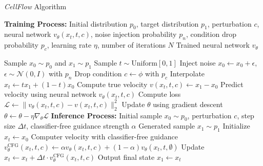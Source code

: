 \begin{algorithm}[htbp]
\caption{\emph{CellFlow} Algorithm}
\label{alg:flow_matching}

\begin{minipage}{\linewidth}
\begin{algorithmic}
\STATE \hspace{-1em}\textbf{Training Process:}
\INPUT Initial distribution $p_0$, target distribution $p_1$, perturbation $c$, 
neural network $v_\theta(x_t, t, c)$, noise injection probability $p_n$, condition drop probability $p_c$, learning rate $\eta$, number of iterations $N$
\OUTPUT Trained neural network $v_\theta$

    \STATE Sample $x_0 \sim p_0$ and $x_1 \sim p_1$
    \STATE Sample $t \sim \text{Uniform}[0, 1]$
    \STATE Inject noise $x_0 \gets x_0 + \epsilon$, $\epsilon \sim \mathcal{N}(0,I)$ with $p_n$
    \STATE Drop condition $c \gets \phi$ with $p_c$
    \STATE Interpolate $x_t \gets t x_1 + (1-t)x_0$
    \STATE Compute true velocity $v(x_t, t, c) \gets x_1 - x_0$
    \STATE Predict velocity using neural network $v_\theta(x_t, t, c)$
    \STATE Compute loss $\mathcal{L} \gets \| v_\theta(x_t, t, c) - v(x_t, t, c) \|_2^2$
    \STATE Update $\theta$ using gradient descent $\theta \gets \theta - \eta \nabla_\theta \mathcal{L}$
\ENDFOR
\vspace{1em}
\STATE \hspace{-1em}\textbf{Inference Process:}
\INPUT Initial sample $x_0 \sim p_0$, perturbation $c$, step size $\Delta t$, classifier-free guidance strength $\alpha$
\OUTPUT Generated sample $x_1 \sim p_1$
\STATE Initialize $x_t \gets x_0$
    \STATE Computer velocity with classifier-free guidance $v_\theta^\text{CFG}(x_t, t, c) \gets \alpha v_\theta(x_t, t, c) + (1-\alpha) v_\theta(x_t, t, \emptyset)$
    \STATE Update $x_t \gets x_t + \Delta t \cdot v_\theta^\text{CFG}(x_t, t, c)$
\ENDFOR
\STATE Output final state $x_1 \gets x_t$
\end{algorithmic}
\end{minipage}
\label{alg:celldiff}
\end{algorithm}